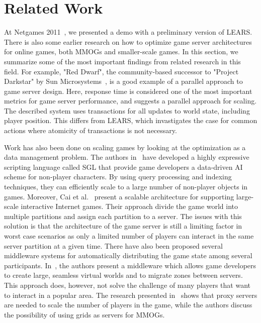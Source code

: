 \section{Related Work}\label{sec:related}
At Netgames 2011~\cite{raaen++2011}, we presented a demo with a preliminary version of LEARS.
%
There is also some earlier research on how to optimize game server
architectures for online games, both MMOGs and smaller-scale games. In
this section, we summarize some of the most important findings from
related research in this field. 
%
For example, "Red Dwarf", the community-based successor to "Project
Darkstar" by Sun Microsystems~\cite{waldo-2008}, is a good example 
of a parallel approach to game server design. Here, response time is 
considered one of the most important metrics for game server performance, 
and suggests a parallel approach for scaling. The described system 
uses transactions for all updates to world state, including player 
position. This differs from LEARS, which invastigates the case for common actions where atomicity of transactions is not necessary. 

Work has also been done on scaling games by looking at the
optimization as a data management problem. The authors
in~\cite{white-2007} have developed a highly expressive scripting
language called SGL that provide game developers a data-driven AI
scheme for non-player characters. By using query processing and
indexing techniques, they can efficiently scale to a large number of
non-player objects in games.
%
Moreover, Cai et al.~\cite{Cai2002++} present a scalable architecture
for supporting large-scale interactive Internet games. Their approach
divide the game world into multiple partitions and assign each
partition to a server. The issues with this solution is that the
architecture of the game server is still a limiting factor in worst
case scenarios as only a limited number of players can interact in the
same server partition at a given time. 
%
There have also been proposed
several middleware systems for automatically distributing the game
state among several participants. In~\cite{Glinka2007++}, the authors
present a middleware which allows game developers to create
large, seamless virtual worlds and to migrate zones between
servers. This approach does, however, not solve the challenge of many
players that want to interact in a popular
area. 
The research presented in~\cite{Muller2007++} shows that proxy
servers are needed to scale the number of players in the game, while the authors discuss the possibility of
using grids as servers for MMOGs. 

